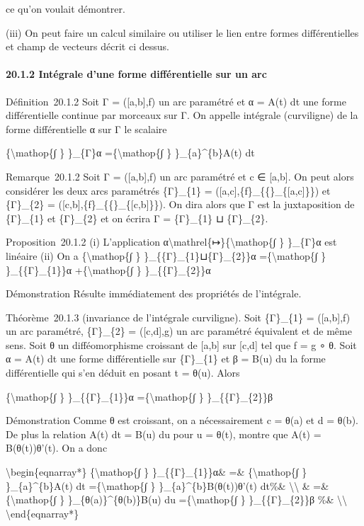 \documentclass[]{article}
\begin{document}
ce qu'on voulait démontrer.

(iii) On peut faire un calcul similaire ou utiliser le lien entre formes
différentielles et champ de vecteurs décrit ci dessus.

\paragraph{20.1.2 Intégrale d'une forme différentielle sur un arc}

Définition~20.1.2 Soit Γ = ({[}a,b{]},f) un arc paramétré et α = A(t) dt
une forme différentielle continue par morceaux sur Γ. On appelle
intégrale (curviligne) de la forme différentielle α sur Γ le scalaire

\{\textbackslash{}mathop\{∫ \} \}\_\{Γ\}α =\{\textbackslash{}mathop\{∫
\} \}\_\{a\}\^{}\{b\}A(t) dt

Remarque~20.1.2 Soit Γ = ({[}a,b{]},f) un arc paramétré et c ∈
{[}a,b{]}. On peut alors considérer les deux arcs paramétrés
\{Γ\}\_\{1\} = ({[}a,c{]},\{f\}\_\{\{\textbar{}\}\_\{{[}a,c{]}\}\}) et
\{Γ\}\_\{2\} = ({[}c,b{]},\{f\}\_\{\{\textbar{}\}\_\{{[}c,b{]}\}\}). On
dira alors que Γ est la juxtaposition de \{Γ\}\_\{1\} et \{Γ\}\_\{2\} et
on écrira Γ = \{Γ\}\_\{1\} ⊔ \{Γ\}\_\{2\}.

Proposition~20.1.2 (i) L'application
α\textbackslash{}mathrel\{↦\}\{\textbackslash{}mathop\{∫ \} \}\_\{Γ\}α
est linéaire (ii) On a \{\textbackslash{}mathop\{∫ \}
\}\_\{\{Γ\}\_\{1\}⊔\{Γ\}\_\{2\}\}α =\{\textbackslash{}mathop\{∫ \}
\}\_\{\{Γ\}\_\{1\}\}α +\{\textbackslash{}mathop\{∫ \}
\}\_\{\{Γ\}\_\{2\}\}α

Démonstration Résulte immédiatement des propriétés de l'intégrale.

Théorème~20.1.3 (invariance de l'intégrale curviligne). Soit
\{Γ\}\_\{1\} = ({[}a,b{]},f) un arc paramétré, \{Γ\}\_\{2\} =
({[}c,d{]},g) un arc paramétré équivalent et de même sens. Soit θ un
difféomorphisme croissant de {[}a,b{]} sur {[}c,d{]} tel que f = g ∘ θ.
Soit α = A(t) dt une forme différentielle sur \{Γ\}\_\{1\} et β = B(u)
du la forme différentielle qui s'en déduit en posant t = θ(u). Alors

\{\textbackslash{}mathop\{∫ \} \}\_\{\{Γ\}\_\{1\}\}α
=\{\textbackslash{}mathop\{∫ \} \}\_\{\{Γ\}\_\{2\}\}β

Démonstration Comme θ est croissant, on a nécessairement c = θ(a) et d =
θ(b). De plus la relation A(t) dt = B(u) du pour u = θ(t), montre que
A(t) = B(θ(t))θ'(t). On a donc

\textbackslash{}begin\{eqnarray*\} \{\textbackslash{}mathop\{∫ \}
\}\_\{\{Γ\}\_\{1\}\}α\& =\& \{\textbackslash{}mathop\{∫ \}
\}\_\{a\}\^{}\{b\}A(t) dt =\{\textbackslash{}mathop\{∫ \}
\}\_\{a\}\^{}\{b\}B(θ(t))θ'(t) dt\%\& \textbackslash{}\textbackslash{}
\& =\& \{\textbackslash{}mathop\{∫ \} \}\_\{θ(a)\}\^{}\{θ(b)\}B(u) du
=\{\textbackslash{}mathop\{∫ \} \}\_\{\{Γ\}\_\{2\}\}β \%\&
\textbackslash{}\textbackslash{} \textbackslash{}end\{eqnarray*\}
\end{document}
